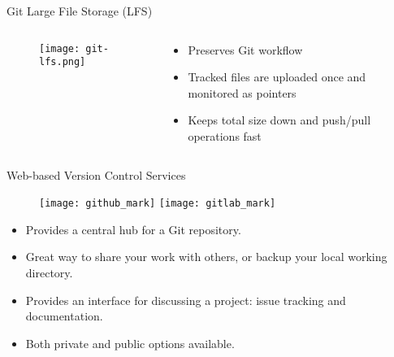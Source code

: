 \documentclass{beamer}
\begin{document}
\begin{frame}{Git Large File Storage (LFS)}
  \begin{columns}
    \begin{column}{0.5\textwidth}
      \begin{figure}[]
        \centering
        \texttt{[image: git-lfs.png]}
        \caption{}
      \end{figure}
    \end{column}

    \begin{column}{0.5\textwidth}
      \begin{itemize}
        \item Preserves Git workflow

        \item Tracked files are uploaded once and monitored as pointers

        \item Keeps total size down and push/pull operations fast
      \end{itemize}
    \end{column}
  \end{columns}
\end{frame}

%
% 
%
%
%
\begin{frame}{Web-based Version Control Services}
  \begin{figure}
    \center
    \texttt{[image: github\_mark]}
    \texttt{[image: gitlab\_mark]}
  \end{figure}

  \begin{itemize}
    \item Provides a central hub for a Git repository.

    \item Great way to share your work with others, or backup your local working directory.

    \item Provides an interface for discussing a project: issue tracking and documentation.

    \item Both private and public options available.
  \end{itemize}
\end{frame}
\end{document}
